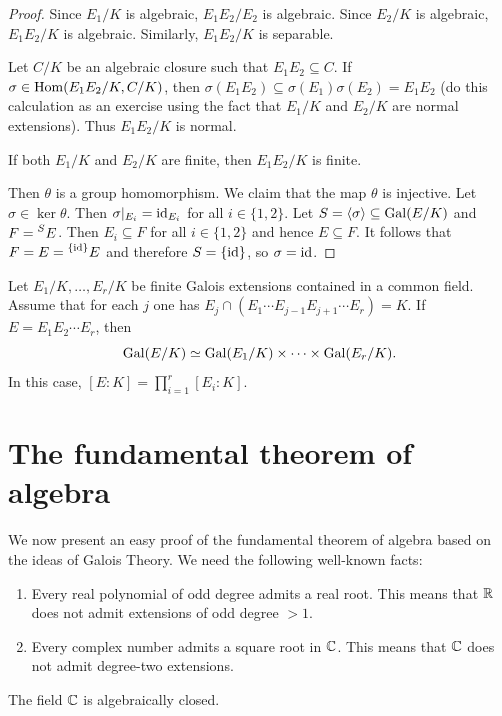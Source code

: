 \begin{proof}
    Since $E_1/K$ is algebraic, 
    $E_1E_2/E_2$ is algebraic. Since $E_2/K$ is algebraic, $E_1E_2/K$ is algebraic. Similarly, 
    $E_1E_2/K$ is separable. 
    
    Let $C/K$ be an algebraic closure such that $E_1E_2\subseteq C$. If $\sigma\in\operatorname{Hom}(E_1E_2/K,C/K)$, then 
    $\sigma(E_1E_2)\subseteq\sigma(E_1)\sigma(E_2)=E_1E_2$ (do this calculation as an exercise using the fact that
    $E_1/K$ and $E_2/K$ are normal extensions). 
    Thus $E_1E_2/K$ is normal. 
    
    If both $E_1/K$ and $E_2/K$ are finite, then $E_1E_2/K$ is finite. 
    
    Then $\theta$ is a group homomorphism. We claim that the map $\theta$ is injective. Let $\sigma\in\ker\theta$. Then
    $\sigma|_{E_i}=\operatorname{id}_{E_i}$ for all $i\in\{1,2\}$. Let $S=\langle\sigma\rangle\subseteq\operatorname{Gal}(E/K)$ and
    $F=\prescript{S}{}{E}$. Then $E_i\subseteq F$ for all $i\in\{1,2\}$ and
    hence $E\subseteq F$. It follows that $F=E=\prescript{\{\operatorname{id}\}}{}{E}$ and therefore $S=\{\operatorname{id}\}$, so 
    $\sigma=\operatorname{id}$. 
\end{proof}

\begin{exercise}
    Let $E_1/K,\dots,E_r/K$ be finite Galois extensions contained in a common field. Assume that for each $j$ 
    one has $E_j\cap (E_1\cdots E_{j-1}E_{j+1}\cdots E_r)=K$. If $E=E_1E_2\cdots E_r$, then
    \[
    \operatorname{Gal}(E/K)\simeq\operatorname{Gal}(E_1/K)\times\cdots\times\operatorname{Gal}(E_r/K).
    \]
    In this case, $[E:K]=\prod_{i=1}^r[E_i:K]$. 
\end{exercise}

\section{The fundamental theorem of algebra}

We now present an easy proof of the fundamental theorem 
of algebra based on the ideas of Galois Theory. 
We need the following well-known facts:
\begin{enumerate}
\item Every real polynomial of odd degree admits a real root. This means that $\mathbb{R}$ 
does not admit extensions of odd degree $>1$. 
\item Every complex number admits a square root in $\mathbb{C}$. This means that $\mathbb{C}$ 
does not admit degree-two extensions.
\end{enumerate}

\begin{theorem}
The field $\mathbb{C}$ is algebraically closed.
\end{theorem}

